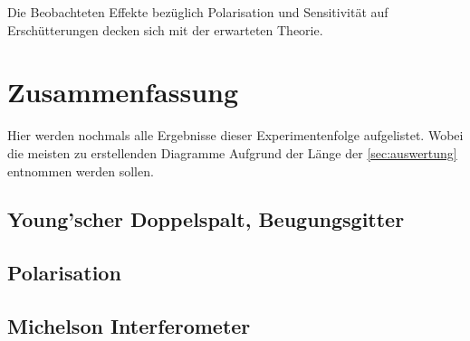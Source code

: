 \documentclass[12pt,english,ngerman]{scrartcl}
\begin{document}
Die Beobachteten Effekte bezüglich Polarisation und Sensitivität auf Erschütterungen decken sich mit der erwarteten Theorie.

\section{Zusammenfassung}\label{sec:zusammenfassung}

Hier werden nochmals alle Ergebnisse dieser Experimentenfolge aufgelistet.
Wobei die meisten zu erstellenden Diagramme Aufgrund der Länge der
\autoref{sec:auswertung} entnommen werden sollen.

\subsection{Young'scher Doppelspalt, Beugungsgitter}


\subsection{Polarisation}


\subsection{Michelson Interferometer}


\newpage
\printbibliography
\listoffigures
\listoftables
\end{document}
